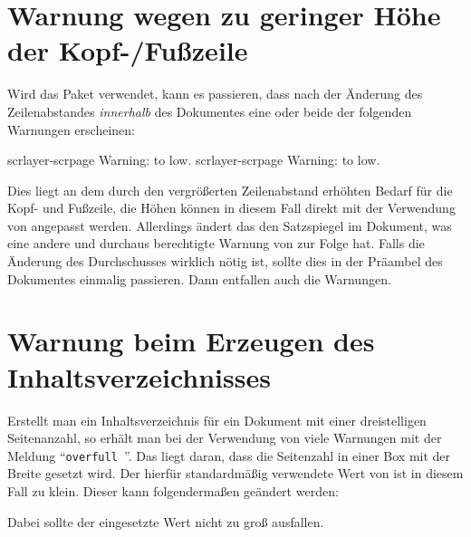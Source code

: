 \section{Warnung wegen zu geringer Höhe der Kopf-/Fußzeile}
\label{sec:tips:headline}
Wird das Paket  verwendet, kann es passieren, dass nach der 
Änderung des Zeilenabstandes \emph{innerhalb} des Dokumentes eine oder beide 
der folgenden Warnungen erscheinen:
%
\begin{quoting}
\begin{Code}
scrlayer-scrpage Warning: \headheight to low.
scrlayer-scrpage Warning: \footheight to low.
\end{Code}
\end{quoting}
%
Dies liegt an dem durch den vergrößerten Zeilenabstand erhöhten Bedarf für die
Kopf- und Fußzeile, die Höhen können in diesem Fall direkt mit der Verwendung 
von  angepasst werden. Allerdings ändert das den 
Satzspiegel im Dokument, was eine andere und durchaus berechtigte Warnung von 
 zur Folge hat. Falls die Änderung des Durchschusses wirklich 
nötig ist, sollte dies in der Präambel des Dokumentes einmalig passieren. Dann 
entfallen auch die Warnungen.



\section{Warnung beim Erzeugen des Inhaltsverzeichnisses}
%
%
%
Erstellt man ein Inhaltsverzeichnis für ein Dokument mit einer dreistelligen 
Seitenanzahl, so erhält man bei der Verwendung von  
viele Warnungen mit der Meldung \enquote{\texttt{overfull }}. Das 
liegt daran, dass die Seitenzahl in einer Box mit der Breite 
gesetzt wird. Der hierfür standardmäßig verwendete Wert von \PValue{1.55em} ist 
in diesem Fall zu klein. Dieser kann folgendermaßen geändert werden:
%
\begin{quoting}
\begin{Code}
\makeatletter
\renewcommand*\@pnumwidth{2em}
\makeatother
\end{Code}
\end{quoting}
%
Dabei sollte der eingesetzte Wert nicht zu groß ausfallen.



